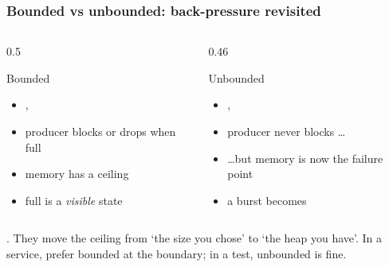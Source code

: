 \documentclass[aspectratio=169,10pt,compress]{beamer}
\begin{document}
\begin{frame}[t,fragile] \frametitle{Bounded vs unbounded: back-pressure revisited}
  \begin{columns}[T]
    \begin{column}{0.5\textwidth}
      \begin{block}{Bounded}
        \small
        \begin{itemize}
          \item {}, 
          \item producer blocks or drops when full
          \item memory has a ceiling
          \item full is a \emph{visible} state
        \end{itemize}
      \end{block}
    \end{column}
    \begin{column}{0.46\textwidth}
      \begin{block}{Unbounded}
        \small
        \begin{itemize}
          \item {}, 
          \item producer never blocks \dots
          \item \dots but memory is now the failure point
          \item a burst becomes 
        \end{itemize}
      \end{block}
    \end{column}
  \end{columns}
  \vspace{0.4em}
  \small
  . They move the
  ceiling from `the size you chose' to `the heap you have'. In a
  service, prefer bounded at the boundary; in a test, unbounded is fine.
\end{frame}

\end{document}
